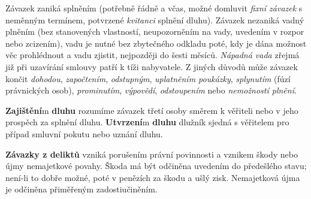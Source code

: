 \documentclass[twoside,12pt]{article}
\begin{document}
Závazek zaniká splněním (potřebně řádně a včas, možné domluvit \textit{fixní závazek} s neměnným termínem, potvrzené \textit{kvitanci} splnění dluhu). Závazek nezaniká vadný plněním (bez stanovených vlastností, neupozorněním na vady, uvedením v rozpor nebo zcizením), vadu je nutné bez zbytečného odkladu poté, kdy je dána možnost věc prohlédnout a vadu zjistit, nejpozději do šesti měsíců. \textit{Nápadná vada} zřejmá již při uzavírání smlouvy patří k tíži nabyvatele. Z jiných důvodů může závazek končit \textit{dohodou}, \textit{započtením}, \textit{odstupným}, \textit{uplatněním poukázky}, \textit{splynutím} (fúzí právnických osob), \textit{prominutím}, \textit{výpovědí}, \textit{odstoupením} nebo \textit{nemožností plnění}.

\textbf{Zajištění}m \textbf{dluhu} rozumíme závazek třetí osoby směrem k věřiteli nebo v jeho prospěch za splnění dluhu. \textbf{Utvrzení}m \textbf{dluhu} dlužník sjedná s věřitelem pro případ smluvní pokutu nebo uznání dluhu.

\textbf{Závazky z deliktů} vzniká porušením právní povinnosti a vznikem škody nebo újmy nemajetkové povahy. Škoda má být odčiněna uvedením do předešlého stavu; není-li to dobře možné, poté v penězích za škodu a ušlý zisk. Nemajetková újma je odčiněna přiměřeným zadostiučiněním.
\end{document}

